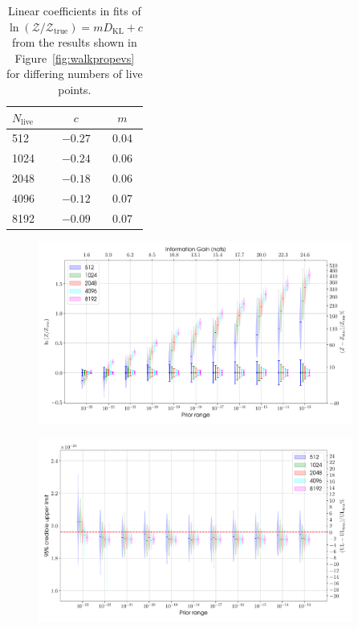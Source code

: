 \begin{table}[h]
\caption{Linear coefficients in fits of $\ln{(\mathcal{Z}/\mathcal{Z}_{\text{true}})} = mD_{\text{KL}} + c$ from the results
shown in Figure~\ref{fig:walkpropevs} for differing numbers of live points.\label{tab:klvsz}}
\begin{center}
\begin{tabular}{l c c}
\hline
\hline
$N_{\text{live}}$ & $c$ & $m$ \\
\hline
512 & $-0.27$ & 0.04 \\
1024 & $-0.24$ & 0.06 \\
2048 & $-0.18$ & 0.06 \\
4096 & $-0.12$ & 0.07 \\
8192 & $-0.09$ & 0.07 \\
\hline
\end{tabular}
\end{center}
\end{table}

\begin{figure}[phtb]
\begin{center}
\includegraphics[width=0.92\textwidth]{./figures/proptesting/walk_prop/evidences/collate_plots_wp_evidences}
\caption{ \protect}
\end{center}
\end{figure}

\begin{figure}[phtb]
\begin{center}
\includegraphics[width=0.92\textwidth]{./figures/proptesting/walk_prop/upperlimits/collate_plots_wp_uls}
\caption{ \protect}
\end{center}
\end{figure}

